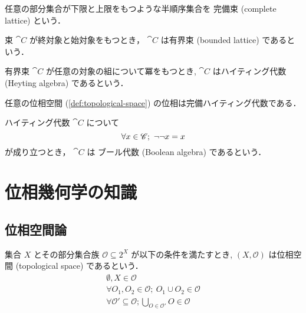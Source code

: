 \documentclass[titlepage]{ltjsreport}
\begin{document}
\begin{definition}[完備束]\label{def:complete-lattice}%
  任意の部分集合が下限と上限をもつような半順序集合を
  完備束
  (complete lattice)
  という．
\end{definition}

\begin{definition}[有界束]
  束 $\cat{C}$ が終対象と始対象をもつとき，
  $\cat{C}$ は有界束 (bounded lattice) であるという．
\end{definition}

\begin{definition}[ハイティング代数]\label{def:heyting-algebra}%
  有界束 $\cat{C}$ が任意の対象の組について冪をもつとき,
  $\cat{C}$ はハイティング代数 (Heyting algebra) であるという．
\end{definition}

\begin{theorem}
  任意の位相空間 (\cref{def:topological-space})
  の位相は完備ハイティング代数である．
\end{theorem}

\begin{definition}[ブール代数]\label{def:boolean-algebra}
  ハイティング代数 $\cat{C}$ について
  \begin{equation}
    \forall x\in\objs{\cat{C}};\ \neg\neg x=x
  \end{equation}
  が成り立つとき，
  $\cat{C}$ は ブール代数 (Boolean algebra) であるという．
\end{definition}

\chapter{位相幾何学の知識}

\section{位相空間論}

\begin{definition}[位相空間]\label{def:topological-space}
  集合 $X$ とその部分集合族 $\mathcal{O}\subseteq2^X$ が以下の条件を満たすとき,
  $(X,\mathcal{O})$ は位相空間 (topological space) であるという．
  \begin{align}
    \emptyset,X\in\mathcal{O}                                 \\
    \forall O_1,O_2\in\mathcal{O};\ O_1\cup O_2\in\mathcal{O} \\
    \forall \mathcal{O}'\subseteq\mathcal{O};
    \bigcup_{O\in\mathcal{O}'}O\in\mathcal{O}
  \end{align}
\end{definition}
\end{document}
